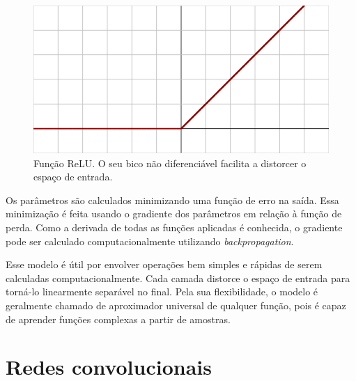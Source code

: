 \begin{figure}[!ht]
	\centering
	\includegraphics[width=\linewidth*2/3]{files/assets/deeplearning/relu.png}
	\caption{Função ReLU. O seu bico não diferenciável
	facilita a distorcer o espaço de entrada.}
	\label{img:preview}
\end{figure}


Os parâmetros são calculados minimizando
uma função de erro na saída. Essa minimização
é feita usando o gradiente dos parâmetros
em relação à função de perda. Como a derivada
de todas as funções aplicadas é conhecida,
o gradiente pode ser calculado computacionalmente
utilizando \textit{backpropagation}.




Esse modelo é útil por envolver operações
bem simples e rápidas de serem calculadas
computacionalmente. Cada camada distorce
o espaço de entrada para torná-lo linearmente
separável no final. Pela sua flexibilidade,
o modelo é geralmente chamado de aproximador 
universal de qualquer função, pois
é capaz de aprender funções complexas
a partir de amostras.



\section{Redes convolucionais}

